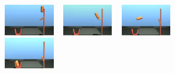 \begin{figure}[t]
    \centering
    
    \begin{subfigure}[t]{0.48\textwidth}
        \centering
        \includegraphics[width=0.24\textwidth]{figures/tosser/tosser1.png}%
        ~%
        \includegraphics[width=0.24\textwidth]{figures/tosser/tosser2.png}%
        ~%
        \includegraphics[width=0.24\textwidth]{figures/tosser/tosser3.png}%
        ~%
        \includegraphics[width=0.24\textwidth]{figures/tosser/tosser4.png}
        \vspace{-0.5cm}
        \caption{ }
        \label{fig:tosser:im}
    \end{subfigure}
    

\end{figure}
